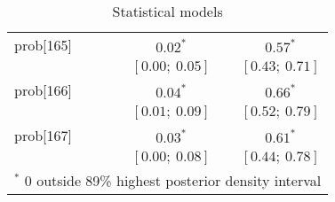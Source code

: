 \begin{table}
\begin{center}
\begin{tabular}{l c c c c c c }
prob[165] &                           &                           &                           & $0.02^{*}$              &                           & $0.57^{*}$            \\
          &                           &                           &                           & $[0.00;\ 0.05]$         &                           & $[0.43;\ 0.71]$       \\
prob[166] &                           &                           &                           & $0.04^{*}$              &                           & $0.66^{*}$            \\
          &                           &                           &                           & $[0.01;\ 0.09]$         &                           & $[0.52;\ 0.79]$       \\
prob[167] &                           &                           &                           & $0.03^{*}$              &                           & $0.61^{*}$            \\
          &                           &                           &                           & $[0.00;\ 0.08]$         &                           & $[0.44;\ 0.78]$       \\
\hline
\multicolumn{7}{l}{\scriptsize{$^*$ 0 outside 89\% highest posterior density interval}}
\end{tabular}
\caption{Statistical models}
\label{table:coefficients}
\end{center}
\end{table}
